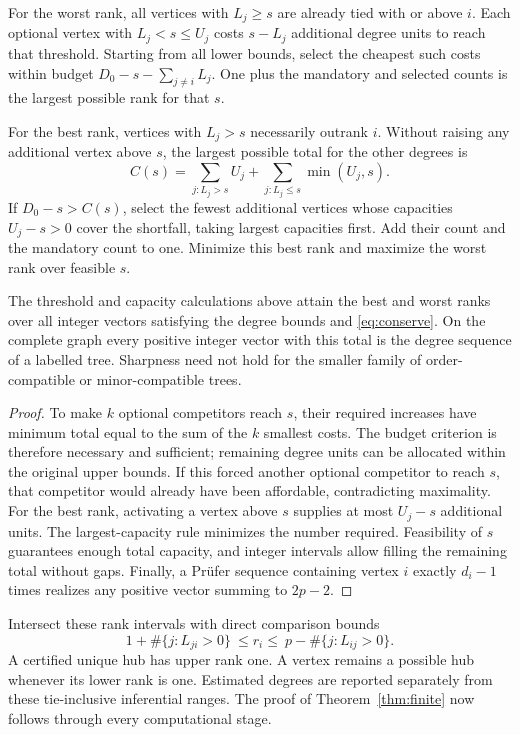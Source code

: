 \documentclass[11pt]{article}
\theoremstyle{plain}
\theoremstyle{definition}\newtheorem{remark}{Remark}\newtheorem{example}{Example}
\begin{document}
For the worst rank, all vertices with $L_j\ge s$ are already tied with or above $i$. Each optional vertex with $L_j<s\le U_j$ costs $s-L_j$ additional degree units to reach that threshold. Starting from all lower bounds, select the cheapest such costs within budget $D_0-s-\sum_{j\ne i}L_j$. One plus the mandatory and selected counts is the largest possible rank for that $s$.

For the best rank, vertices with $L_j>s$ necessarily outrank $i$. Without raising any additional vertex above $s$, the largest possible total for the other degrees is
\[
 C(s)=\sum_{j:L_j>s}U_j+\sum_{j:L_j\le s}\min(U_j,s).
\]
If $D_0-s>C(s)$, select the fewest additional vertices whose capacities $U_j-s>0$ cover the shortfall, taking largest capacities first. Add their count and the mandatory count to one. Minimize this best rank and maximize the worst rank over feasible $s$.

\begin{proposition}\label{prop:ranks}
The threshold and capacity calculations above attain the best and worst ranks over all integer vectors satisfying the degree bounds and \eqref{eq:conserve}. On the complete graph every positive integer vector with this total is the degree sequence of a labelled tree. Sharpness need not hold for the smaller family of order-compatible or minor-compatible trees.
\end{proposition}
\begin{proof}
To make $k$ optional competitors reach $s$, their required increases have minimum total equal to the sum of the $k$ smallest costs. The budget criterion is therefore necessary and sufficient; remaining degree units can be allocated within the original upper bounds. If this forced another optional competitor to reach $s$, that competitor would already have been affordable, contradicting maximality. For the best rank, activating a vertex above $s$ supplies at most $U_j-s$ additional units. The largest-capacity rule minimizes the number required. Feasibility of $s$ guarantees enough total capacity, and integer intervals allow filling the remaining total without gaps. Finally, a Pr\"ufer sequence containing vertex $i$ exactly $d_i-1$ times realizes any positive vector summing to $2p-2$.
\end{proof}

Intersect these rank intervals with direct comparison bounds
\begin{equation}\label{eq:pairranks}
 1+\#\{j:L_{ji}>0\}\ \le r_i\le\ p-\#\{j:L_{ij}>0\}.
\end{equation}
A certified unique hub has upper rank one. A vertex remains a possible hub whenever its lower rank is one. Estimated degrees are reported separately from these tie-inclusive inferential ranges. The proof of Theorem~\ref{thm:finite} now follows through every computational stage.
\end{document}
